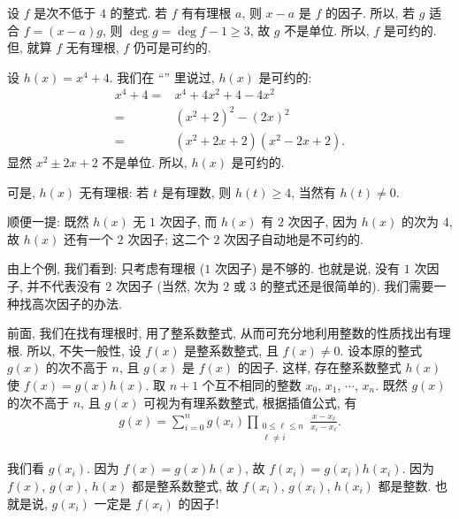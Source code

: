 设 $f$ 是次不低于 $4$ 的整式. 若 $f$ 有有理根 $a$, 则 $x-a$ 是 $f$ 的因子. 所以, 若 $g$ 适合 $f = (x-a)g$, 则 $\deg g = \deg f - 1 \geq 3$, 故 $g$ 不是单位. 所以, $f$ 是可约的. 但, 就算 $f$ 无有理根, $f$ 仍可是可约的.

\begin{example}
    设 $h(x) = x^4 + 4$. 我们在 ``\PolynomialsOverZAndOverQ'' 里说过, $h(x)$ 是可约的:
    \begin{align*}
        x^4 + 4
        = {} & x^4 + 4x^2 + 4 - 4x^2          \\
        = {} & (x^2 + 2)^2 - (2x)^2           \\
        = {} & (x^2 + 2x + 2) (x^2 - 2x + 2).
    \end{align*}
    显然 $x^2 \pm 2x + 2$ 不是单位. 所以, $h(x)$ 是可约的.

    可是, $h(x)$ 无有理根: 若 $t$ 是有理数, 则 $h(t) \geq 4$, 当然有 $h(t) \neq 0$.

    顺便一提: 既然 $h(x)$ 无 $1$ 次因子, 而 $h(x)$ 有 $2$ 次因子, 因为 $h(x)$ 的次为 $4$, 故 $h(x)$ 还有一个 $2$ 次因子; 这二个 $2$ 次因子自动地是不可约的.
\end{example}

由上个例, 我们看到: 只考虑有理根 ($1$ 次因子) 是不够的. 也就是说, 没有 $1$ 次因子, 并不代表没有 $2$ 次因子 (当然, 次为 $2$ 或 $3$ 的整式还是很简单的). 我们需要一种找高次因子的办法.

前面, 我们在找有理根时, 用了整系数整式, 从而可充分地利用整数的性质找出有理根. 所以, 不失一般性, 设 $f(x)$ 是整系数整式, 且 $f(x) \neq 0$. 设本原的整式 $g(x)$ 的次不高于 $n$, 且 $g(x)$ 是 $f(x)$ 的因子. 这样, 存在整系数整式 $h(x)$ 使 $f(x) = g(x) h(x)$. 取 $n+1$ 个互不相同的整数 $x_0$, $x_1$, $\cdots$, $x_n$. 既然 $g(x)$ 的次不高于 $n$, 且 $g(x)$ 可视为有理系数整式, 根据插值公式, 有
\begin{align*}
    g(x) = \sum_{i = 0}^{n} g(x_i) \prod_{\begin{smallmatrix}0 \leq \ell \leq n \\\ell \neq i\end{smallmatrix}} \frac{x - x_\ell}{x_i - x_\ell}. \tag*{(L)}
\end{align*}

我们看 $g(x_i)$. 因为 $f(x) = g(x) h(x)$, 故 $f(x_i) = g(x_i) h(x_i)$. 因为 $f(x)$, $g(x)$, $h(x)$ 都是整系数整式, 故 $f(x_i)$, $g(x_i)$, $h(x_i)$ 都是整数. 也就是说, $g(x_i)$ 一定是 $f(x_i)$ 的因子!

